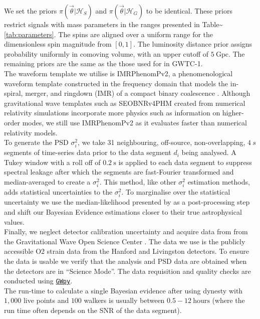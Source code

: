 \documentclass[%
preprint,
 amsmath,amssymb,
 aps,
]{revtex4}
\newcommand{\dynesty}{{\sc dynesty}\xspace}
\newcommand{\gwpy}{{\sc \href{https://gwpy.github.io/}{\texttt{GWpy}}}\xspace}
\newcommand{\imrphenomp}{{\sc IMRPhenomPv2}\xspace}
\newcommand{\seob}{{\sc SEOBNRv4PHM}\xspace}
\newcommand{\psd}{{\sc $\sigma^2_i$}\xspace}
\begin{document}
We set the priors $\pi(\vec{\theta}|\mathcal{H}_S)$ and $\pi(\vec{\theta}|\mathcal{H}_G)$ to be identical. These priors restrict signals with mass parameters in the ranges presented in Table\textasciitilde\ref{tab:parameters}. The spins are aligned over a uniform range for the dimensionless spin magnitude from $\left[0,1\right]$. The luminosity distance prior assigns probability uniformly in comoving volume, with an upper cutoff of $5\ \text{Gpc}$. The remaining priors are the same as the those used for in GWTC-1. \\

The waveform template we utilise is \imrphenomp, a phenomenological waveform template constructed in the frequency domain that models the in-spiral, merger, and ringdown (IMR) of a compact binary coalescence \citep{khan2016frequency}. Although gravitational wave templates such as \seob \cite{seob} created from numerical relativity simulations incorporate more physics such as information on higher-order modes, we still use \imrphenomp as it evaluates faster than numerical relativity models. \\

To generate the PSD \psd, we take 31 neighbouring, off-source, non-overlapping,  $4\ s$  segments of time-series data prior to the data segment $d_i$ being analysed. A Tukey window with a roll off of $0.2\ \text{s}$ is applied to each data segment to suppress spectral leakage after which the segments are fast-Fourier transformed and median-averaged to create a \psd \cite{ligo_psd}. This method, like other \psd estimation methods, adds statistical uncertainties to the \psd \cite{psd_student_t}. To marginalise over the statistical uncertainty we use the median-likelihood presented by \citet{psd_student_t} as a post-processing step and shift our Bayesian Evidence estimations closer to their true astrophysical values. \\ 

Finally, we neglect detector calibration uncertainty and acquire data from from the Gravitational Wave Open Science Center \cite{GWOSC}. The data we use is the publicly accessible O2 strain data from the Hanford and Livingston detectors. To ensure the data is usable we verify that the analysis and PSD data are obtained when the detectors are  in ``Science Mode''. The data requisition and quality checks are conducted using \gwpy \cite{gwpy}. \\

The run-time to calculate a single Bayesian evidence after using \dynesty with $1,000$ live points and $100$ walkers is usually between $0.5-12\ \text{hours}$ (where the run time often depends on the SNR of the data segment). \\
\end{document}
